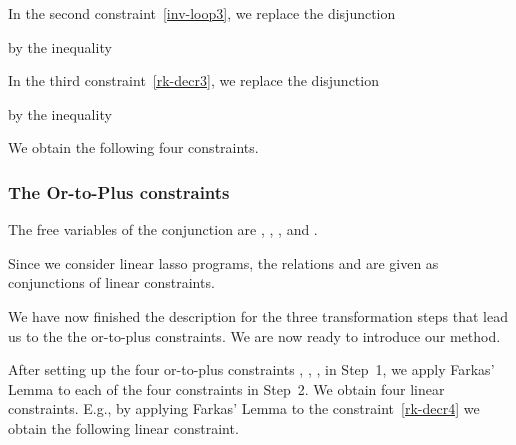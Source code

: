 \documentclass[a4paper]{llncs}
\begin{document}
In the second constraint~\eqref{inv-loop3}, we replace the disjunction 

by the inequality 

In the third constraint~\eqref{rk-decr3}, we replace the disjunction 

by the inequality

We obtain the following four constraints.
\subsubsection{The Or-to-Plus constraints}\noindent

The free variables of the conjunction  are , , , and .
\bigskip


Since we consider linear lasso programs, the relations  and  are given as conjunctions of linear constraints.


\bigskip



We have now finished the description for the three transformation steps that lead us to the the or-to-plus constraints. We are now ready to introduce our method.

\medskip

\begin{center}
\end{center}

\medskip

After setting up the four or-to-plus constraints , , ,  in Step~1, we apply Farkas' Lemma to each of the four constraints in Step~2.
We obtain four linear constraints.
E.g., by applying Farkas' Lemma to the constraint~\eqref{rk-decr4} we obtain the following linear constraint.
\end{document}
